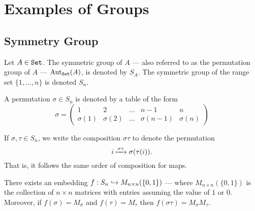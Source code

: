 \section{Examples of Groups}

\subsection{Symmetry Group}

\begin{definition}\label{def: sym-group}
    Let \(A \in {\texttt{Set}}\). The symmetric group of \(A\) --- also referred to as the
    permutation group of \(A\) --- \(\operatorname{Aut}_{\texttt{Set}}(A)\), is denoted by \(S_A\). The
    symmetric group of the range set \(\{1, \dots, n\}\) is denoted \(S_n\).
\end{definition}

\begin{notation}[Permutations]
    A permutation \(\sigma \in S_n\) is denoted by a table of the form
    \[
        \sigma =
        \begin{pmatrix}
            1         & 2         & \dots & n-1         & n         \\
            \sigma(1) & \sigma(2) & \dots & \sigma(n-1) & \sigma(n)
        \end{pmatrix}
    \]
\end{notation}

\begin{remark}[Convention]\label{rem: convention-perm}
    If \(\sigma, \tau \in S_n\), we write the composition \(\sigma \tau\)
    to denote the permutation
    \[
        i \xmapsto{\sigma\tau} \sigma(\tau(i)).
    \]
    That is, it follows the same order of composition for maps.
\end{remark}

\begin{proposition}
    There exists an embedding \(f: S_n \hookrightarrow M_{n \times n}(\{0, 1\})\)
    --- where \(M_{n \times n}(\{0, 1\})\) is the collection of \(n \times n\)
    matrices with entries assuming the value of \(1\) or \(0\). Moreover, if
    \(f(\sigma) = M_\sigma\) and \(f(\tau) = M_\tau\) then \(f(\sigma \tau) =
    M_\sigma M_\tau\).
\end{proposition}

